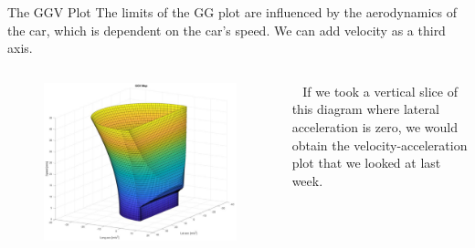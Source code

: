 \begin{frame}{The GGV Plot}
    The limits of the GG plot
    are influenced by the aerodynamics of the car,
    which is dependent on the car's speed.
    We can add velocity as a third axis.
    \begin{columns}
        \begin{figure}
            \includegraphics[width=\textwidth]{res/GGV Plot.png}
        \end{figure}
        \begin{block}{~}
            If we took a vertical slice of this diagram
            where lateral acceleration is zero,
            we would obtain the velocity-acceleration plot
            that we looked at last week.
        \end{block}
    \end{columns}
\end{frame}